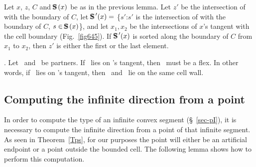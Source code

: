 
\begin{corollary}
\label{cor-645}
Let $x$, $z$, $C$ and $\mbox{S\hspace{-0.68em}S\hspace{.25em}}(x)$ be as in the previous lemma.
Let $z'$ be the intersection of  with the boundary of $C$,
let $\mbox{S\hspace{-0.68em}S\hspace{.25em}}'(x) =$ \{$s'$:$s'$ is the intersection of  with the 
boundary of $C$, $s \in \mbox{S\hspace{-0.68em}S\hspace{.25em}}(x)$\},
and let $x_{1},x_{2}$ be the intersections of $x$'s tangent with the 
cell boundary
{\rm (}Fig.~{\rm\ref{fig645})}.
If $\mbox{S\hspace{-0.68em}S\hspace{.25em}}'(x)$ is sorted along the boundary of $C$ from $x_{1}$ to $x_{2}$,
then $z'$ is either the first or the last element.
\end{corollary}

\begin{lemma}
\label{Ll}
{\rm \cite[p. 119]{jj}}.
Let \wo\ and \wt\ be partners.
If \wt\ lies on \wo's tangent, then \wo\ must be a flex.
In other words, if \wt\ lies on \wo's tangent, 
then \wo\ and \wt\ lie on the same cell wall.
\end{lemma}

\subsection{Computing the infinite direction from a point}

In order to compute the type of an infinite convex 
segment (\S~\ref{sec-pI}), 
it is necessary to compute the infinite direction from a point of that 
infinite segment.
As seen in Theorem~\ref{Tps}, for our purposes the point will either be 
an artificial
endpoint or a point outside the bounded cell.
The following lemma shows how to perform this computation.

